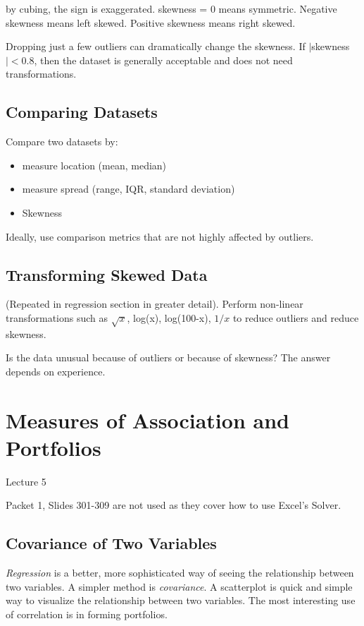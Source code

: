 \documentclass[11pt, oneside]{article}   	%
\begin{document}
by cubing, the sign is exaggerated. skewness = 0 means symmetric. Negative skewness means left skewed. Positive skewness means right skewed.

Dropping just a few outliers can dramatically change the skewness. If $|$skewness$|  < 0.8$, then the dataset is generally acceptable and does not need transformations.

\subsection{Comparing Datasets}

Compare two datasets by:
\begin{itemize}
\item{measure location (mean, median)}
\item{measure spread (range, IQR, standard deviation)}
\item{Skewness}
\end{itemize}

Ideally, use comparison metrics that are not highly affected by outliers.

\subsection{Transforming Skewed Data}

(Repeated in regression section in greater detail). Perform non-linear transformations such as $\sqrt{x}$, log(x), log(100-x), $1/x$ to reduce outliers and reduce skewness.

Is the data unusual because of outliers or because of skewness? The answer depends on experience.

\section{Measures of Association and Portfolios}
Lecture 5

Packet 1, Slides 301-309 are not used as they cover how to use Excel's Solver.

\subsection{Covariance of Two Variables}

\textit{Regression} is a better, more sophisticated way of seeing the relationship between two variables. A simpler method is \textit{covariance}. A scatterplot is quick and simple way to visualize the relationship between two variables. The most interesting use of correlation is in forming portfolios.
\end{document}
